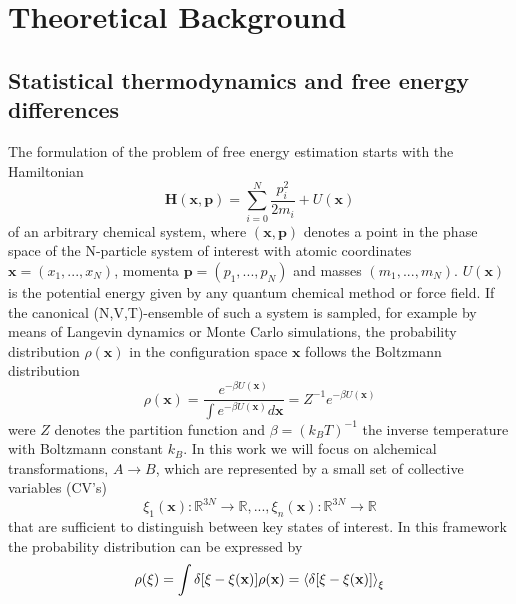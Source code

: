 \chapter{Theoretical Background}
\label{cha:theory}

\section{Statistical thermodynamics and free energy differences}
\label{sec:freeE}

The formulation of the problem of free energy estimation starts with the Hamiltonian
\begin{equation}
  \textbf{H}(\textbf{x},\textbf{p})=\sum_{i=0}^{N}\frac{p_{i}^{ 2}}{2 m_i} + U(\textbf{x})
  \label{eq:lagrangian}
\end{equation}
of an arbitrary chemical system, where $(\textbf{x},\textbf{p})$ denotes a point in the phase space of the N-particle system of interest with atomic coordinates $\textbf{x}=(x_1, ..., x_N)$, momenta $\textbf{p}=(p_1,...,p_N)$ and masses $(m_1,...,m_N)$. $U(\textbf{x})$ is the potential energy given by any quantum chemical method or force field. If the canonical (N,V,T)-ensemble of such a system is sampled, for example by means of Langevin dynamics or Monte Carlo simulations, the probability distribution $\rho(\textbf{x})$ in the configuration space $\textbf{x}$ follows the Boltzmann distribution
\begin{equation}
  \rho(\textbf{x})=\frac{e^{-\beta U(\textbf{x})}}{\int e^{-\beta U(\textbf{x})} d\textbf{x}}=Z^{-1}e^{-\beta U(\textbf{x})}
  \label{eq:boltzmann}
\end{equation}
were $Z$ denotes the partition function and $\beta=(k_B T)^{-1}$ the inverse temperature with Boltzmann constant $k_B$.\autocite{chipot2007free}
In this work we will focus on alchemical transformations, $A\longrightarrow B$, which are represented by a small set of collective variables (CV's)
\begin{equation}
 \xi_1(\textbf{x}) : \mathbb{R} ^{3N} \to \mathbb{R}, ..., \xi_n(\textbf{x}) : \mathbb{R} ^{3N} \to \mathbb{R}
\end{equation}
that are sufficient to distinguish between key states of interest.
In this framework the probability distribution can be expressed by
\begin{equation}
  \rho(\xi)=\int \delta[\xi-\xi(\textbf{x})]\rho(\textbf{x})=\braket{\delta [\xi -\xi(\textbf{x})]}_\xi
  \label{eq:rho}
\end{equation}
